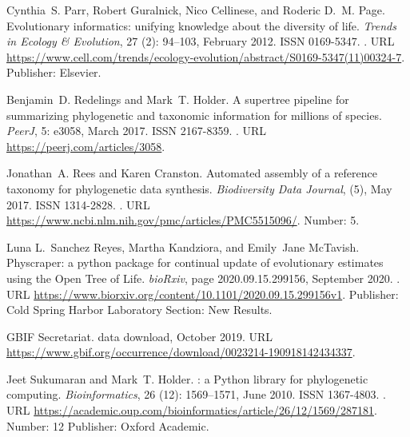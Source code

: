 \documentclass[oupdraft]{sysbio_sse}
\begin{document}
\begin{thebibliography}{18}
Cynthia~S. Parr, Robert Guralnick, Nico Cellinese, and Roderic D.~M. Page.
\newblock Evolutionary informatics: unifying knowledge about the diversity of
  life.
\newblock \emph{Trends in Ecology \& Evolution}, 27 (2):
  94--103, February 2012.
\newblock ISSN 0169-5347.
\newblock {}.
\newblock URL
  \url{https://www.cell.com/trends/ecology-evolution/abstract/S0169-5347(11)00324-7}.
\newblock Publisher: Elsevier.

Benjamin~D. Redelings and Mark~T. Holder.
\newblock A supertree pipeline for summarizing phylogenetic and taxonomic
  information for millions of species.
\newblock \emph{PeerJ}, 5: e3058, March 2017.
\newblock ISSN 2167-8359.
\newblock {}.
\newblock URL \url{https://peerj.com/articles/3058}.

Jonathan~A. Rees and Karen Cranston.
\newblock Automated assembly of a reference taxonomy for phylogenetic data
  synthesis.
\newblock \emph{Biodiversity Data Journal},  (5), May 2017.
\newblock ISSN 1314-2828.
\newblock {}.
\newblock URL \url{https://www.ncbi.nlm.nih.gov/pmc/articles/PMC5515096/}.
\newblock Number: 5.

Luna L.~Sanchez Reyes, Martha Kandziora, and Emily~Jane McTavish.
\newblock Physcraper: a python package for continual update of evolutionary
  estimates using the {Open} {Tree} of {Life}.
\newblock \emph{bioRxiv}, page 2020.09.15.299156, September 2020.
\newblock {}.
\newblock URL
  \url{https://www.biorxiv.org/content/10.1101/2020.09.15.299156v1}.
\newblock Publisher: Cold Spring Harbor Laboratory Section: New Results.

GBIF Secretariat.
 data download, October 2019.
\newblock URL
  \url{https://www.gbif.org/occurrence/download/0023214-190918142434337}.

Jeet Sukumaran and Mark~T. Holder.
: a {Python} library for phylogenetic computing.
\newblock \emph{Bioinformatics}, 26 (12): 1569--1571, June
  2010.
\newblock ISSN 1367-4803.
\newblock {}.
\newblock URL
  \url{https://academic.oup.com/bioinformatics/article/26/12/1569/287181}.
\newblock Number: 12 Publisher: Oxford Academic.


\end{thebibliography}
\end{document}
